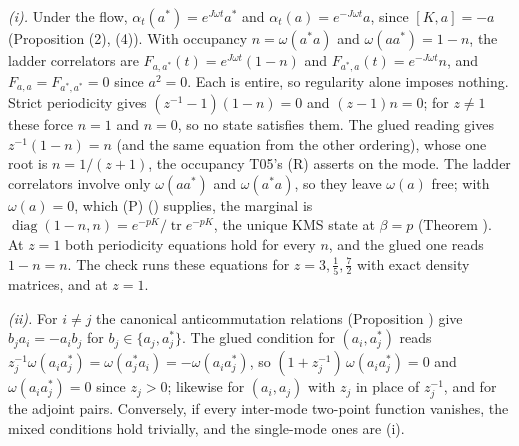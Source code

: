 \emph{(i).} Under the flow, $\alpha_{t}(a^{*}) = e^{J\omega t}a^{*}$ and $\alpha_{t}(a) = e^{-J\omega t}a$, since $[K, a] = -a$ (Proposition (2), (4)). With occupancy $n = \omega(a^{*}a)$ and $\omega(aa^{*}) = 1 - n$, the ladder correlators are $F_{a,a^{*}}(t) = e^{J\omega t}(1 - n)$ and $F_{a^{*},a}(t) = e^{-J\omega t}n$, and $F_{a,a} = F_{a^{*},a^{*}} = 0$ since $a^{2} = 0$. Each is entire, so regularity alone imposes nothing. Strict periodicity gives $(z^{-1} - 1)(1 - n) = 0$ and $(z - 1)n = 0$; for $z \ne 1$ these force $n = 1$ and $n = 0$, so no state satisfies them. The glued reading gives $z^{-1}(1 - n) = n$ (and the same equation from the other ordering), whose one root is $n = 1/(z + 1)$, the occupancy T05's (R) asserts on the mode. The ladder correlators involve only $\omega(aa^{*})$ and $\omega(a^{*}a)$, so they leave $\omega(a)$ free; with $\omega(a) = 0$, which (P) () supplies, the marginal is $\operatorname{diag}(1 - n, n) = e^{-pK}/\operatorname{tr}e^{-pK}$, the unique KMS state at $\beta = p$ (Theorem ). At $z = 1$ both periodicity equations hold for every $n$, and the glued one reads $1 - n = n$. The check runs these equations for $z = 3, \tfrac15, \tfrac72$ with exact density matrices, and at $z = 1$.

\emph{(ii).} For $i \ne j$ the canonical anticommutation relations (Proposition ) give $b_{j}a_{i} = -a_{i}b_{j}$ for $b_{j} \in \{a_{j}, a_{j}^{*}\}$. The glued condition for $(a_{i}, a_{j}^{*})$ reads $z_{j}^{-1}\omega(a_{i}a_{j}^{*}) = \omega(a_{j}^{*}a_{i}) = -\omega(a_{i}a_{j}^{*})$, so $(1 + z_{j}^{-1})\,\omega(a_{i}a_{j}^{*}) = 0$ and $\omega(a_{i}a_{j}^{*}) = 0$ since $z_{j} > 0$; likewise for $(a_{i}, a_{j})$ with $z_{j}$ in place of $z_{j}^{-1}$, and for the adjoint pairs. Conversely, if every inter-mode two-point function vanishes, the mixed conditions hold trivially, and the single-mode ones are (i).

